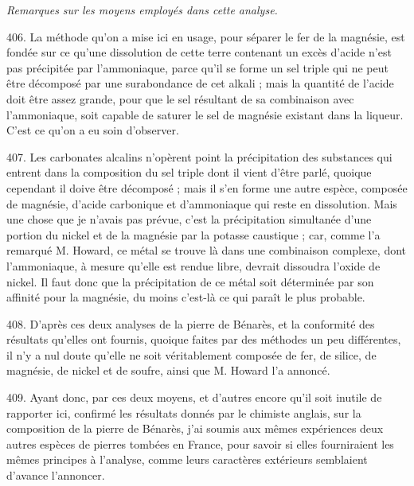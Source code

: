 \documentclass[a4paper, 11pt, oneside, polutonikogreek, french]{article}
\begin{document}
\emph{Remarques sur les moyens employés dans cette analyse.}

406. La méthode qu'on a mise ici en usage, pour séparer le fer de la magnésie, est fondée sur ce qu'une dissolution de cette terre contenant un excès d'acide n'est pas précipitée par l'ammoniaque, parce qu'il se forme un sel triple qui ne peut être décomposé par une surabondance de cet alkali ; mais la quantité de l'acide doit être assez grande, pour que le sel résultant de sa combinaison avec l'ammoniaque, soit capable de saturer le sel de magnésie existant dans la liqueur. C'est ce qu'on a eu soin d'observer.

407. Les carbonates alcalins n'opèrent point la précipitation des substances qui entrent dans la composition du sel triple dont il vient d'être parlé, quoique cependant il doive être décomposé ; mais il s'en forme une autre espèce, composée de magnésie, d'acide carbonique et d'ammoniaque qui reste en dissolution. Mais une chose que je n'avais pas prévue, c'est la précipitation simultanée d'une portion du nickel et de la magnésie par la potasse caustique ; car, comme l'a remarqué M. Howard, ce métal se trouve là dans une combinaison complexe, dont l'ammoniaque, à mesure qu'elle est rendue libre, devrait dissoudra l'oxide de nickel. Il faut donc que la précipitation de ce métal soit déterminée par son affinité pour la magnésie, du moins c'est-là ce qui paraît le plus probable.

408. D'après ces deux analyses de la pierre de Bénarès, et la conformité des résultats qu'elles ont fournis, quoique faites par des méthodes un peu différentes, il n'y a nul doute qu'elle ne soit véritablement composée de fer, de silice, de magnésie, de nickel et de soufre, ainsi que M. Howard l'a annoncé.

409. Ayant donc, par ces deux moyens, et d'autres encore qu'il soit inutile de rapporter ici, confirmé les résultats donnés par le chimiste anglais, sur la composition de la pierre de Bénarès, j'ai soumis aux mêmes expériences deux autres espèces de pierres tombées en France, pour savoir si elles fourniraient les mêmes principes à l'analyse, comme leurs caractères extérieurs semblaient d'avance l'annoncer.
\end{document}

